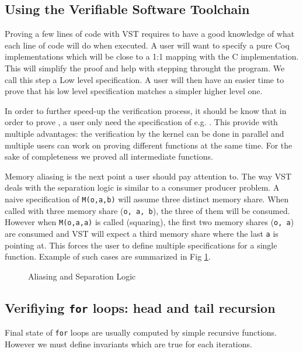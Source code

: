 \subsection{Using the Verifiable Software Toolchain}

Proving a few lines of code with VST requires to have a good knowledge of what
each line of code will do when executed. A user will want to specify a pure Coq
implementations which will be close to a 1:1 mapping with the C implementation.
This will simplify the proof and help with stepping throught the program.
We call this step a Low level specification. A user will then have an easier
time to prove that his low level specification matches a simpler higher level one.

In order to further speed-up the verification process, it should be know that
in order to prove , a user only need the specification
of e.g. . This provide with multiple advantages: the verification by the
kernel can be done in parallel and multiple users can work on proving different
functions at the same time. For the sake of completeness we proved all intermediate
functions.

Memory aliasing is the next point a user should pay attention to. The way VST
deals with the separation logic is similar to a consumer producer problem.
A naive specification of \texttt{M(o,a,b)} will assume three distinct memory share.
When called with three memory share (\texttt{o, a, b}), the three of them will be consumed.
However when \texttt{M(o,a,a)} is called (squaring), the first two memory shares (\texttt{o, a})
are consumed and VST will expect a third memory share where the last \texttt{a} is pointing at.
This forces the user to define multiple specifications for a single function.
Example of such cases are summarized in Fig \ref{tk:MemSame}.
\begin{figure}[h]
  
  \caption{Aliasing and Separation Logic}
  \label{tk:MemSame}
\end{figure}

\subsection{Verifiying \texttt{for} loops: head and tail recursion}

Final state of \texttt{for} loops are usually computed by simple recursive functions.
However we must define invariants which are true for each iterations.

